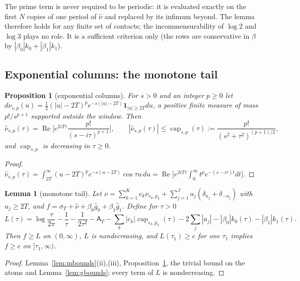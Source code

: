 \documentclass[11pt]{amsart}
\newtheorem{proposition}[theorem]{Proposition}
\newtheorem{lemma}[theorem]{Lemma}
\theoremstyle{definition}
\theoremstyle{remark}
\newcommand{\Rel}{\operatorname{Re}}
\newcommand{\sT}{\sigma_T}
\newcommand{\gh}[1]{\widehat g_{#1}}
\newcommand{\nuh}{\widehat\nu}
\newcommand{\Aconst}{\mathsf A_T}
\begin{document}
The prime term is never required to be periodic: it is evaluated exactly on the first $N$
copies of one period of $\nuh$ and replaced by its infimum beyond. The lemma therefore holds
for any finite set of contacts; the incommensurability of $\log2$ and $\log3$ plays no role.
It is a sufficient criterion only (the rows are conservative in $\beta$ by
$|\beta_0|k_0+|\beta_1|k_1$).

\subsection{Exponential columns: the monotone tail}

\begin{proposition}[exponential columns]\label{prop:T0}
For $s>0$ and an integer $p\ge0$ let $d\nu_{s,p}(u)=\frac12(|u|-2T)^pe^{-s(|u|-2T)}\mathbf 1_{|u|\ge2T}du$,
a positive finite measure of mass $p!/s^{p+1}$ supported outside the window. Then
\[
\nuh_{s,p}(\tau)=\Rel\Big[e^{2iT\tau}\frac{p!}{(s-i\tau)^{p+1}}\Big],\qquad
|\nuh_{s,p}(\tau)|\le\operatorname{cap}_{s,p}(\tau):=\frac{p!}{(s^2+\tau^2)^{(p+1)/2}},
\]
and $\operatorname{cap}_{s,p}$ is decreasing in $\tau\ge0$.
\end{proposition}
\begin{proof}
$\nuh_{s,p}(\tau)=\int_{2T}^\infty(u-2T)^pe^{-s(u-2T)}\cos\tau u\,du=\Rel\big[e^{2iT\tau}\int_0^\infty t^pe^{-(s-i\tau)t}dt\big]$.
\end{proof}

\begin{lemma}[monotone tail]\label{lem:T}
Let $\nu=\sum_{k=1}^Kc_k\nu_{s_k,p_k}+\sum_{j=1}^Ja_j(\delta_{u_j}+\delta_{-u_j})$ with $u_j\ge2T$, and
$f=\sT+\nuh+\beta_0\gh0+\beta_1\gh1$. Define for $\tau>0$
\[
L(\tau)=\log\frac\tau{2\pi}-\frac1\tau-\frac1{2\tau^2}-\Aconst-\sum_k|c_k|\operatorname{cap}_{s_k,p_k}(\tau)
-2\sum_j|a_j|-|\beta_0|k_0(\tau)-|\beta_1|k_1(\tau).
\]
Then $f\ge L$ on $(0,\infty)$, $L$ is nondecreasing, and $L(\tau_1)\ge c$ for one $\tau_1$ implies
$f\ge c$ on $[\tau_1,\infty)$.
\end{lemma}
\begin{proof}
Lemma~\ref{lem:mbounds}(ii),(iii), Proposition~\ref{prop:T0}, the trivial bound on the atoms and
Lemma~\ref{lem:gbounds}; every term of $L$ is nondecreasing.
\end{proof}
\end{document}
